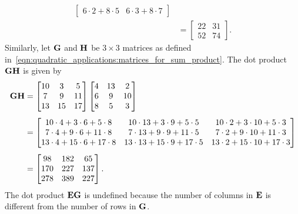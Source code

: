 \documentclass[a4paper,oneside,12pt]{article}
\begin{document}
\begin{problem}
{\begin{solution}
\begin{align*}
\begin{bmatrix}
6 \cdot 2 + 8 \cdot 5 & 6 \cdot 3 + 8 \cdot 7
\end{bmatrix} \\[4pt]
&=
\begin{bmatrix}
22 & 31 \\
52 & 74
\end{bmatrix}.
\end{align*}
Similarly, let $\textbf{G}$ and $\textbf{H}$ be $3 \times 3$ matrices as defined
in~\eqref{eqn:quadratic_applications:matrices_for_sum_product}.  The
dot product $\textbf{G} \textbf{H}$ is given by
\begin{align*}
\textbf{G} \textbf{H}
&=
\begin{bmatrix}
10 & 3  & 5  \\
7  & 9  & 11 \\
13 & 15 & 17
\end{bmatrix}
\begin{bmatrix}
4 & 13 & 2  \\
6 & 9  & 10 \\
8 & 5  & 3
\end{bmatrix} \\[4pt]
&=
\begin{bmatrix}
10 \cdot 4 + 3 \cdot 6 + 5 \cdot 8 & 10 \cdot 13 + 3 \cdot 9 + 5 \cdot 5 & 10 \cdot 2 + 3 \cdot 10 + 5 \cdot 3 \\
7 \cdot 4 + 9 \cdot 6 + 11 \cdot 8 & 7 \cdot 13 + 9 \cdot 9 + 11 \cdot 5 & 7 \cdot 2 + 9 \cdot 10 + 11 \cdot 3 \\
13 \cdot 4 + 15 \cdot 6 + 17 \cdot 8 & 13 \cdot 13 + 15 \cdot 9 + 17 \cdot 5 & 13 \cdot 2 + 15 \cdot 10 + 17 \cdot 3
\end{bmatrix} \\[4pt]
&=
\begin{bmatrix}
98  & 182 & 65  \\
170 & 227 & 137 \\
278 & 389 & 227
\end{bmatrix}.
\end{align*}
The dot product $\textbf{E} \textbf{G}$ is undefined because the number of
columns in $\textbf{E}$ is different from the number of rows in $\textbf{G}$.


\end{solution}}
\end{problem}
\end{document}
